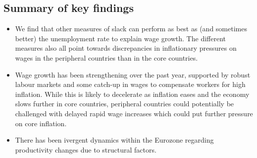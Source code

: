\subsection{Summary of key findings}
\begin{itemize}
    \item We find that other measures of slack can perform as best as (and sometimes better) the unemployment rate to explain wage growth. The different measures also all point towards discrepancies in inflationary pressures on wages in the peripheral countries than in the core countries.
    \item Wage growth has been strengthening over the past year, supported by robust labour markets and some catch-up in wages to compensate workers for high inflation. While this is likely to decelerate as inflation eases and the economy slows further in core countries, peripheral countries could potentially be challenged with delayed rapid wage increases which could put further pressure on core inflation.
    \item There has been ivergent dynamics within the Eurozone regarding productivity changes due to structural factors.
\end{itemize}
